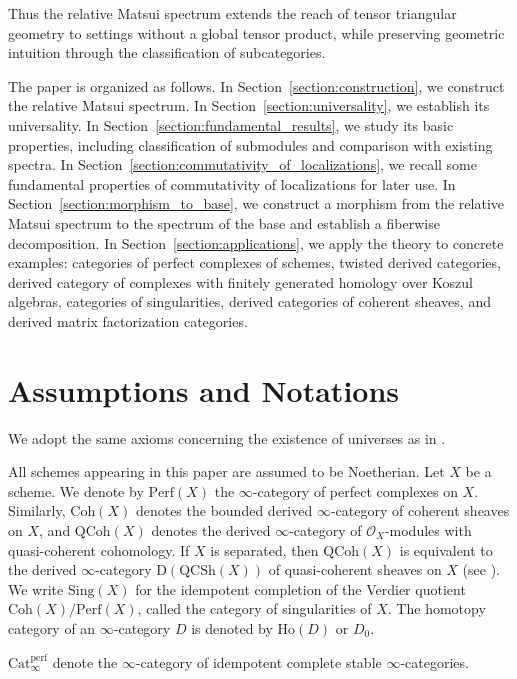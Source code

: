 \documentclass[11pt]{amsart}
\theoremstyle{definition}
\theoremstyle{plain}
\theoremstyle{remark}
\newcommand{\Ho}{\mathrm{Ho}}
\newcommand{\perf}{\mathrm{Perf}}
\newcommand{\qcoh}{\mathrm{QCoh}}
\newcommand{\QCoh}{\mathrm{QCSh}}
\newcommand{\coh}{{\mathrm{Coh}}}
\newcommand{\sO}{\mathscr{O}}
\newcommand{\Perf}{\mathrm{Cat}_{\infty}^{\mathrm{perf}}}
\newcommand{\Sing}{\mathrm{Sing}}
\numberwithin{equation}{section}
\begin{document}
Thus the relative Matsui spectrum extends the reach of tensor triangular geometry to settings without a global tensor product, while preserving geometric intuition through the classification of subcategories.  

The paper is organized as follows.  
In Section~\ref{section:construction}, we construct the relative Matsui spectrum.  
In Section~\ref{section:universality}, we establish its universality.
In Section~\ref{section:fundamental_results}, we study its basic properties, including classification of submodules and comparison with existing spectra.  
In Section~\ref{section:commutativity_of_localizations}, we recall some fundamental properties of commutativity of localizations for later use.  
In Section~\ref{section:morphism_to_base}, we construct a morphism from the relative Matsui spectrum to the spectrum of the base and establish a fiberwise decomposition.  
In Section~\ref{section:applications}, we apply the theory to concrete examples: categories of perfect complexes of schemes, twisted derived categories, derived category of complexes with finitely generated homology over Koszul algebras, categories of singularities, derived categories of coherent sheaves, and derived matrix factorization categories.  



\section*{Assumptions and Notations}

We adopt the same axioms concerning the existence of universes as in \cite{Lu1}.

All schemes appearing in this paper are assumed to be Noetherian.  
Let \(X\) be a scheme.  
We denote by \(\perf(X)\) the \(\infty\)-category of perfect complexes on \(X\).  
Similarly, \(\coh(X)\) denotes the bounded derived \(\infty\)-category of coherent sheaves on \(X\), and \(\qcoh(X)\) denotes the derived \(\infty\)-category of \(\sO_X\)-modules with quasi-coherent cohomology.  
If \(X\) is separated, then \(\qcoh(X)\) is equivalent to the derived \(\infty\)-category \(\mathrm{D}(\QCoh(X))\) of quasi-coherent sheaves on \(X\) (see \cite[Corollary~5.5]{BN}).  
We write \(\Sing(X)\) for the idempotent completion of the Verdier quotient \(\coh(X)/\perf(X)\), called the category of singularities of \(X\).  
The homotopy category of an \(\infty\)-category \(D\) is denoted by \(\Ho(D)\) or \(D_0\).

\(\Perf\) denote the \(\infty\)-category of idempotent complete stable \(\infty\)-categories.
\end{document}
